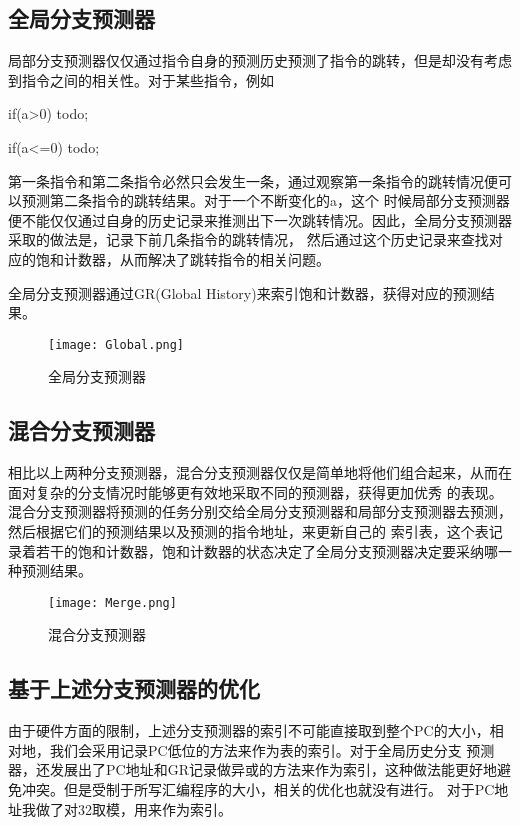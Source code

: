 \documentclass[forprint]{WHUBachelor}
\begin{document}
 \subsection{全局分支预测器}
 局部分支预测器仅仅通过指令自身的预测历史预测了指令的跳转，但是却没有考虑到指令之间的相关性。对于某些指令，例如\par
 if(a>0) todo;\par
if(a<=0) todo;\par
第一条指令和第二条指令必然只会发生一条，通过观察第一条指令的跳转情况便可以预测第二条指令的跳转结果。对于一个不断变化的a，这个
时候局部分支预测器便不能仅仅通过自身的历史记录来推测出下一次跳转情况。因此，全局分支预测器采取的做法是，记录下前几条指令的跳转情况，
然后通过这个历史记录来查找对应的饱和计数器，从而解决了跳转指令的相关问题。\par
全局分支预测器通过GR(Global History)来索引饱和计数器，获得对应的预测结果。\par
\begin{figure}[ht]
  \centering
    \texttt{[image: Global.png]}
    \caption{全局分支预测器}
    \label{fig:3}
  \end{figure}

\subsection{混合分支预测器}
相比以上两种分支预测器，混合分支预测器仅仅是简单地将他们组合起来，从而在面对复杂的分支情况时能够更有效地采取不同的预测器，获得更加优秀
的表现。混合分支预测器将预测的任务分别交给全局分支预测器和局部分支预测器去预测，然后根据它们的预测结果以及预测的指令地址，来更新自己的
索引表，这个表记录着若干的饱和计数器，饱和计数器的状态决定了全局分支预测器决定要采纳哪一种预测结果。
\begin{figure}[ht]
  \centering
    \texttt{[image: Merge.png]}
    \caption{混合分支预测器}
    \label{fig:3}
  \end{figure}

\subsection{基于上述分支预测器的优化}
由于硬件方面的限制，上述分支预测器的索引不可能直接取到整个PC的大小，相对地，我们会采用记录PC低位的方法来作为表的索引。对于全局历史分支
预测器，还发展出了PC地址和GR记录做异或的方法来作为索引，这种做法能更好地避免冲突。但是受制于所写汇编程序的大小，相关的优化也就没有进行。
对于PC地址我做了对32取模，用来作为索引。
\end{document}
